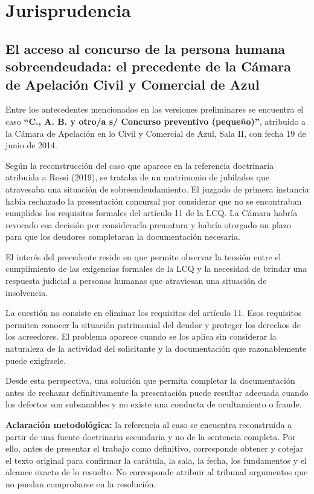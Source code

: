 \documentclass[12pt,oneside]{book}
\begin{document}
\chapter[Jurisprudencia]{Jurisprudencia}

\section[Acceso al concurso: precedente de la Cámara de Azul]{El acceso al concurso de la persona humana sobreendeudada: el precedente de la Cámara de Apelación Civil y Comercial de Azul}

Entre los antecedentes mencionados en las versiones preliminares se encuentra el caso \textbf{``C., A. B. y otro/a s/ Concurso preventivo (pequeño)''}, atribuido a la Cámara de Apelación en lo Civil y Comercial de Azul, Sala II, con fecha 19 de junio de 2014.

Según la reconstrucción del caso que aparece en la referencia doctrinaria atribuida a Rossi (2019), se trataba de un matrimonio de jubilados que atravesaba una situación de sobreendeudamiento. El juzgado de primera instancia había rechazado la presentación concursal por considerar que no se encontraban cumplidos los requisitos formales del artículo 11 de la LCQ. La Cámara habría revocado esa decisión por considerarla prematura y habría otorgado un plazo para que los deudores completaran la documentación necesaria.

El interés del precedente reside en que permite observar la tensión entre el cumplimiento de las exigencias formales de la LCQ y la necesidad de brindar una respuesta judicial a personas humanas que atraviesan una situación de insolvencia.

La cuestión no consiste en eliminar los requisitos del artículo 11. Esos requisitos permiten conocer la situación patrimonial del deudor y proteger los derechos de los acreedores. El problema aparece cuando se los aplica sin considerar la naturaleza de la actividad del solicitante y la documentación que razonablemente puede exigírsele.

Desde esta perspectiva, una solución que permita completar la documentación antes de rechazar definitivamente la presentación puede resultar adecuada cuando los defectos son subsanables y no existe una conducta de ocultamiento o fraude.

\begin{important}
\textbf{Aclaración metodológica:} la referencia al caso se encuentra reconstruida a partir de una fuente doctrinaria secundaria y no de la sentencia completa. Por ello, antes de presentar el trabajo como definitivo, corresponde obtener y cotejar el texto original para confirmar la carátula, la sala, la fecha, los fundamentos y el alcance exacto de lo resuelto. No corresponde atribuir al tribunal argumentos que no puedan comprobarse en la resolución.
\end{important}
\end{document}
